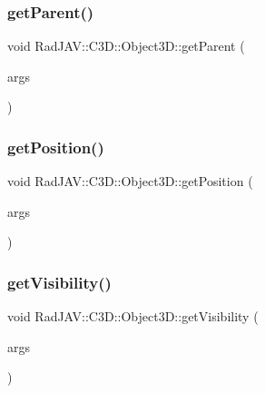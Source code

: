 \subsubsection{\texorpdfstring{get\+Parent()}{getParent()}}
{\footnotesize\ttfamily void Rad\+J\+A\+V\+::\+C3\+D\+::\+Object3\+D\+::get\+Parent (\begin{DoxyParamCaption}\item[{const v8\+::\+Function\+Callback\+Info$<$ v8\+::\+Value $>$ \&}]{args }\end{DoxyParamCaption})\hspace{0.3cm}{\ttfamily [static]}}

\mbox{\label{class_rad_j_a_v_1_1_c3_d_1_1_object3_d_aa4846c6adfaf1468999de8304ce825c6}} 
\subsubsection{\texorpdfstring{get\+Position()}{getPosition()}}
{\footnotesize\ttfamily void Rad\+J\+A\+V\+::\+C3\+D\+::\+Object3\+D\+::get\+Position (\begin{DoxyParamCaption}\item[{const v8\+::\+Function\+Callback\+Info$<$ v8\+::\+Value $>$ \&}]{args }\end{DoxyParamCaption})\hspace{0.3cm}{\ttfamily [static]}}

\mbox{\label{class_rad_j_a_v_1_1_c3_d_1_1_object3_d_a715f9ef0bcb724109d78d7f13f6fe3d8}} 
\subsubsection{\texorpdfstring{get\+Visibility()}{getVisibility()}}
{\footnotesize\ttfamily void Rad\+J\+A\+V\+::\+C3\+D\+::\+Object3\+D\+::get\+Visibility (\begin{DoxyParamCaption}\item[{const v8\+::\+Function\+Callback\+Info$<$ v8\+::\+Value $>$ \&}]{args }\end{DoxyParamCaption})\hspace{0.3cm}{\ttfamily [static]}}

